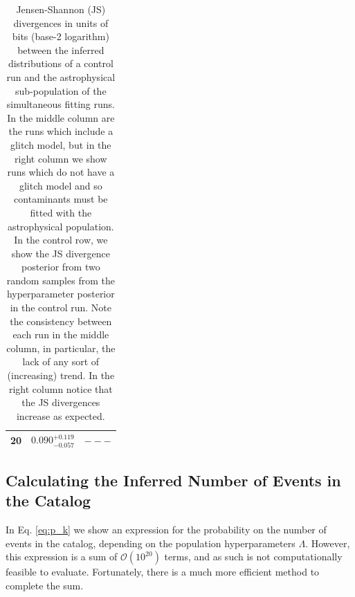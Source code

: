 \begin{refsection}
\begin{table}
\begin{tabular}{|c|c|c|}
 	20 & $0.090^{+0.119}_{-0.057}$ & $---$ \\ \hline 
    \end{tabular}
    \caption{Jensen-Shannon (JS) divergences in units of bits (base-2 logarithm) between the inferred distributions of a control run and the astrophysical sub-population of the simultaneous fitting runs. In the middle column are the runs which include a glitch model, but in the right column we show runs which do not have a glitch model and so contaminants must be fitted with the astrophysical population. In the control row, we show the JS divergence posterior from two random samples from the hyperparameter posterior in the control run. Note the consistency between each run in the middle column, in particular, the lack of any sort of (increasing) trend. In the right column notice that the JS divergences increase as expected.}
    \label{tab:js_divergences}
\end{table}

\subsection*{Calculating the Inferred Number of Events in the Catalog}

In Eq. \ref{eq:p_k} we show an expression for the probability on the number of events in the catalog, depending on the population hyperparameters $\Lambda$. However, this expression is a sum of $\mathcal{O}(10^{20})$ terms, and as such is not computationally feasible to evaluate. Fortunately, there is a much more efficient method to complete the sum.


\end{refsection}
